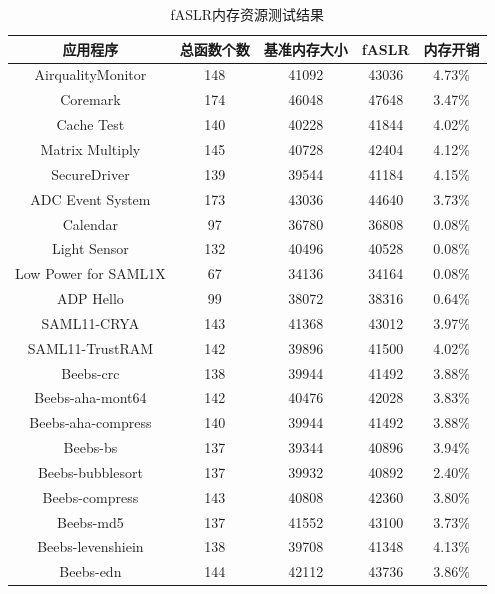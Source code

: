 \documentclass[12pt,a4paper]{ctexart}
\numberwithin{figure}{section}
\begin{document}
\begin{longtable}{ccccc}
	\caption{fASLR内存资源测试结果}
	\label{table2} \\
    \hline
    应用程序                 & 总函数个数 & 基准内存大小 & fASLR & 内存开销   \\ \hline
    AirqualityMonitor    & 148   & 41092  & 43036 & 4.73\% \\ 
    Coremark             & 174   & 46048  & 47648 & 3.47\% \\ 
    Cache Test           & 140   & 40228  & 41844 & 4.02\% \\ 
    Matrix Multiply      & 145   & 40728  & 42404 & 4.12\% \\ 
    SecureDriver         & 139   & 39544  & 41184 & 4.15\% \\ 
    ADC Event System     & 173   & 43036  & 44640 & 3.73\% \\ 
    Calendar             & 97    & 36780  & 36808 & 0.08\% \\ 
    Light Sensor         & 132   & 40496  & 40528 & 0.08\% \\ 
    Low Power for SAML1X & 67    & 34136  & 34164 & 0.08\% \\ 
    ADP Hello            & 99    & 38072  & 38316 & 0.64\% \\ 
    SAML11-CRYA          & 143   & 41368  & 43012 & 3.97\% \\ 
    SAML11-TrustRAM      & 142   & 39896  & 41500 & 4.02\% \\ 
    Beebs-crc            & 138   & 39944  & 41492 & 3.88\% \\ 
    Beebs-aha-mont64     & 142   & 40476  & 42028 & 3.83\% \\ 
    Beebs-aha-compress   & 140   & 39944  & 41492 & 3.88\% \\ 
    Beebs-bs             & 137   & 39344  & 40896 & 3.94\% \\ 
    Beebs-bubblesort     & 137   & 39932  & 40892 & 2.40\% \\ 
    Beebs-compress       & 143   & 40808  & 42360 & 3.80\% \\ 
    Beebs-md5            & 137   & 41552  & 43100 & 3.73\% \\ 
    Beebs-levenshiein    & 138   & 39708  & 41348 & 4.13\% \\ 
    Beebs-edn            & 144   & 42112  & 43736 & 3.86\% \\ \hline
\end{longtable}
\end{document}
